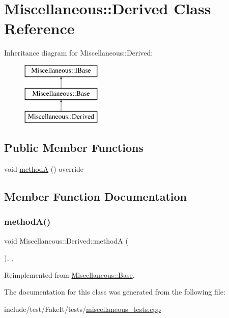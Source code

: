 \hypertarget{classMiscellaneous_1_1Derived}{}\section{Miscellaneous\+::Derived Class Reference}
\label{classMiscellaneous_1_1Derived}
Inheritance diagram for Miscellaneous\+::Derived\+:\begin{figure}[H]
\begin{center}
\leavevmode
\includegraphics[height=3.000000cm]{classMiscellaneous_1_1Derived}
\end{center}
\end{figure}
\subsection*{Public Member Functions}
\begin{DoxyCompactItemize}
\item 
void \mbox{\hyperlink{classMiscellaneous_1_1Derived_a580f237659791e97b60e1cd57aadc361}{methodA}} () override
\end{DoxyCompactItemize}


\subsection{Member Function Documentation}
\mbox{\label{classMiscellaneous_1_1Derived_a580f237659791e97b60e1cd57aadc361}} 
\subsubsection{\texorpdfstring{methodA()}{methodA()}}
{\footnotesize\ttfamily void Miscellaneous\+::\+Derived\+::methodA (\begin{DoxyParamCaption}{ }\end{DoxyParamCaption})\hspace{0.3cm}{\ttfamily [inline]}, {\ttfamily [override]}, {\ttfamily [virtual]}}



Reimplemented from \mbox{\hyperlink{classMiscellaneous_1_1Base_a232b441e93771353e2a61dd083066e69}{Miscellaneous\+::\+Base}}.



The documentation for this class was generated from the following file\+:\begin{DoxyCompactItemize}
\item 
include/test/\+Fake\+It/tests/\mbox{\hyperlink{miscellaneous__tests_8cpp}{miscellaneous\+\_\+tests.\+cpp}}\end{DoxyCompactItemize}
